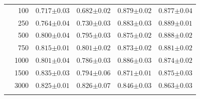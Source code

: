 \begin{table}[!hbt]
\begin{subtable}{\textwidth}
\begin{tabularx}{0.99\textwidth}{cr| *{4}{Y}}
             & 100  & $0.717{\scriptscriptstyle\pm0.03}$                   & $0.682{\scriptscriptstyle\pm0.02}$          & $0.879{\scriptscriptstyle\pm0.02}$          & $0.877{\scriptscriptstyle\pm0.04}$          \\
             & 250  & $0.764{\scriptscriptstyle\pm0.04}$                   & $0.730{\scriptscriptstyle\pm0.03}$          & $0.883{\scriptscriptstyle\pm0.03}$          & $\mathbf{0.889{\scriptscriptstyle\pm0.01}}$ \\
             & 500  & $0.800{\scriptscriptstyle\pm0.04}$                   & $0.795{\scriptscriptstyle\pm0.03}$          & $0.875{\scriptscriptstyle\pm0.02}$          & $0.888{\scriptscriptstyle\pm0.02}$          \\
             & 750  & $0.815{\scriptscriptstyle\pm0.01}$                   & $0.801{\scriptscriptstyle\pm0.02}$          & $0.873{\scriptscriptstyle\pm0.02}$          & $0.881{\scriptscriptstyle\pm0.02}$          \\
             & 1000 & $0.801{\scriptscriptstyle\pm0.04}$                   & $0.786{\scriptscriptstyle\pm0.03}$          & $\mathbf{0.886{\scriptscriptstyle\pm0.03}}$ & $0.874{\scriptscriptstyle\pm0.02}$          \\
             & 1500 & $\mathbf{0.835{\scriptscriptstyle\pm0.03}}$          & $0.794{\scriptscriptstyle\pm0.06}$          & $0.871{\scriptscriptstyle\pm0.01}$          & $0.875{\scriptscriptstyle\pm0.03}$          \\
             & 3000 & $0.825{\scriptscriptstyle\pm0.01}$                   & $\mathbf{0.826{\scriptscriptstyle\pm0.07}}$ & $0.846{\scriptscriptstyle\pm0.03}$          & $0.863{\scriptscriptstyle\pm0.03}$          \\
                                                                                                                                                                                        \\
        \end{tabularx}
    \end{subtable}


\end{table}
